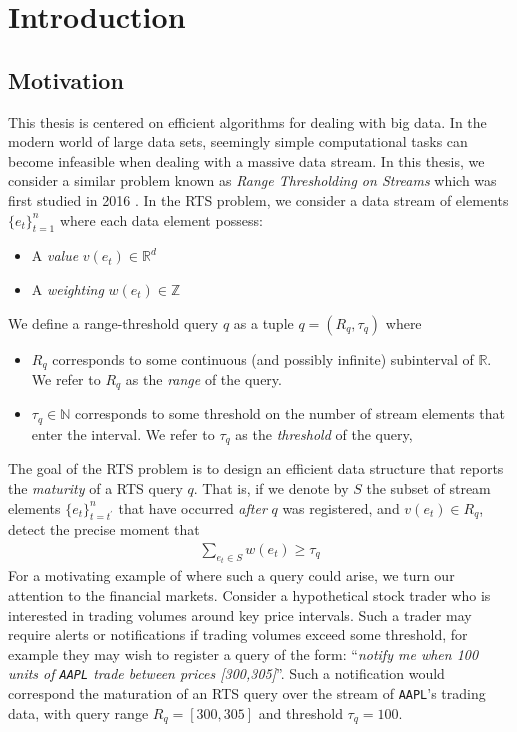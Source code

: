 
\chapter{Introduction}



\section{Motivation}
This thesis is centered on efficient algorithms for dealing with big data. In the modern world of large data sets, seemingly simple computational tasks can become infeasible when dealing with a massive data stream. 
In this thesis, we consider a similar problem known as \textit{Range Thresholding on Streams} which was first studied in 2016 \cite{Gan2016}. In the RTS problem, we consider a data stream of elements $\{e_t\}^{n}_{t=1}$ where each data element possess: 
\begin{itemize}
    \item A \textit{value} $v(e_t)\in\mathbb{R}^d$
    \item A \textit{weighting} $w(e_t)\in\mathbb{Z}$
\end{itemize}
We define a range-threshold query $q$ as a tuple $q = (R_q, \tau_q)$ where 
\begin{itemize}
    \item $R_q$ corresponds to some continuous (and possibly infinite) subinterval of $\mathbb{R}$. We refer to $R_q$ as the \textit{range} of the query. 
    \item $\tau_q \in\mathbb{N}$ corresponds to some threshold on the number of stream elements that enter the interval. We refer to $\tau_q$ as the \textit{threshold} of the query,
\end{itemize}
The goal of the RTS problem is to design an efficient data structure that reports the \textit{maturity} of a RTS query $q$. That is, if we denote by $S$ the subset of stream elements $\{e_t\}_{t=t^\prime}^{n}$ that have occurred \textit{after} $q$ was registered, and $v(e_t) \in R_{q}$, detect the precise moment that
\begin{align}
    \sum_{e_t \in S} w(e_t) \geq \tau_q
\end{align}
For a motivating example of where such a query could arise, we turn our attention to the financial markets. Consider a hypothetical stock trader who is interested in trading volumes around key price intervals. Such a trader may require alerts or notifications if trading volumes exceed some threshold, for example they may wish to register a query of the form: ``\textit{notify me when 100 units of \texttt{AAPL} trade between prices [300,305]}''. Such a notification would correspond the maturation of an RTS query over the stream of \texttt{AAPL}'s trading data, with query range $R_q = [300,305]$ and threshold $\tau_q = 100$. \\
